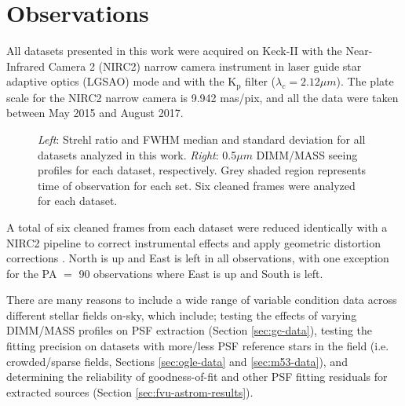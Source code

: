 \documentclass[]{spie}  %
\begin{document}

\section{Observations} \label{sec:observations}
All datasets presented in this work were acquired on Keck-II with the Near-Infrared Camera 2 (NIRC2) narrow camera instrument in laser guide star adaptive optics (LGSAO) mode and with the K$_\textrm{p}$ filter ($\lambda_{c} = 2.12 \mu m$). The plate scale for the NIRC2 narrow camera is 9.942 mas/pix, and all the data were taken between May 2015 and August 2017.

\begin{figure}[!htb]
 \caption{\footnotesize \textit{Left}: Strehl ratio and FWHM median and standard deviation for all datasets analyzed in this work. \textit{Right}: 0.5$\mu m$ DIMM/MASS seeing profiles for each dataset, respectively. Grey shaded region represents time of observation for each set. Six cleaned frames were analyzed for each dataset. \label{fig:dimmmass_datasets}}
\end{figure}

\noindent A total of six cleaned frames from each dataset were reduced identically with a NIRC2 pipeline to correct instrumental effects \citep{ghez:2008a, lu:2008a} and apply geometric distortion corrections \cite{lu:2008a, service:2016a}. North is up and East is left in all observations, with one exception for the PA $=$ 90 observations where East is up and South is left.

There are many reasons to include a wide range of variable condition data across different stellar fields on-sky, which include; testing the effects of varying DIMM/MASS profiles on PSF extraction (Section \ref{sec:gc-data}), testing the fitting precision on datasets with more/less PSF reference stars in the field (i.e. crowded/sparse fields, Sections \ref{sec:ogle-data} and \ref{sec:m53-data}), and determining the reliability of goodness-of-fit and other PSF fitting residuals for extracted sources (Section \ref{sec:fvu-astrom-results}).
\end{document}
